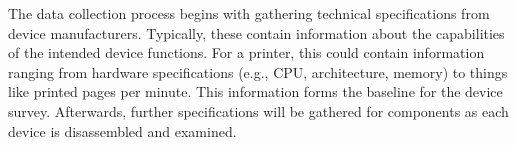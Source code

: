 The data collection process begins with gathering technical specifications from device manufacturers. Typically, these contain information about the capabilities of the intended device functions. For a printer, this could contain information ranging from hardware specifications (e.g., CPU, architecture, memory) to things like printed pages per minute. This information forms the baseline for the device survey. Afterwards, further specifications will be gathered for components as each device is disassembled and examined.











